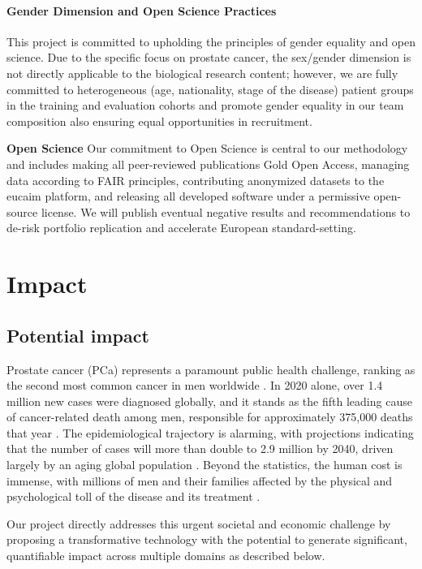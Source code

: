 \documentclass[11pt, a4paper]{article}
\begin{document}
\paragraph{Gender Dimension and Open Science Practices}
This project is committed to upholding the principles of gender equality and open science. Due to the specific focus on prostate cancer, the sex/gender dimension is not directly applicable to the biological research content; however, we are fully committed to heterogeneous (age, nationality, stage of the disease) patient groups in the training and evaluation cohorts and promote gender equality in our team composition also ensuring equal opportunities in recruitment. 

\textbf{Open Science}
Our commitment to Open Science is central to our methodology and includes making all peer-reviewed publications Gold Open Access, managing data according to FAIR principles, contributing anonymized datasets to the \gls{eucaim} platform, and releasing all developed software under a permissive open-source license. We will publish eventual negative results and recommendations to de-risk portfolio replication and accelerate European standard-setting. 

\section{Impact}
\subsection{Potential impact }

Prostate cancer (PCa) represents a paramount public health challenge, ranking as the second most common cancer in men worldwide \cite{CaraccioloCastello2024,DulleaOSullivan2025}. In 2020 alone, over 1.4 million new cases were diagnosed globally, and it stands as the fifth leading cause of cancer-related death among men, responsible for approximately 375,000 deaths that year \cite{CereserEvangelista2023,GammelSolari2024,DharCendejasGomez2024}. The epidemiological trajectory is alarming, with projections indicating that the number of cases will more than double to 2.9 million by 2040, driven largely by an aging global population \cite{UdovicichJia2025,SungFerlay2021}.
Beyond the statistics, the human cost is immense, with millions of men and their families affected by the physical and psychological toll of the disease and its treatment \cite{NardoneMarmorino2024}.

Our project directly addresses this urgent societal and economic challenge by proposing a transformative technology with the potential to generate significant, quantifiable impact across multiple domains as described below.
\end{document}

